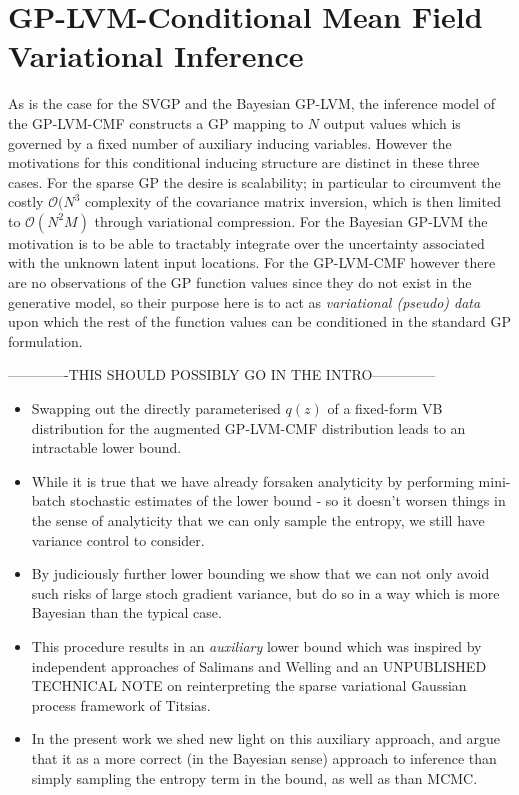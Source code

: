 \documentclass[]{article}
\begin{document}
\section{GP-LVM-Conditional Mean Field Variational Inference} \label{sec:gplvmcmf}

As is the case for the SVGP and the Bayesian GP-LVM, the inference model of the GP-LVM-CMF constructs a GP mapping to $N$ output values which is governed by a fixed number of auxiliary inducing variables.
However the motivations for this conditional inducing structure are distinct in these three cases.
For the sparse GP the desire is scalability; in particular to circumvent the costly $\mathcal{O}(N^3$ complexity of the covariance matrix inversion, which is then limited to $\mathcal{O}(N^2M)$ through variational compression.
For the Bayesian GP-LVM the motivation is to be able to tractably integrate over the uncertainty associated with the unknown latent input locations.
For the GP-LVM-CMF however there are no observations of the GP function values since they do not exist in the generative model, so their purpose here is to act as \emph{variational (pseudo) data} upon which the rest of the function values can be conditioned in the standard GP formulation.

-------------THIS SHOULD POSSIBLY GO IN THE INTRO--------------

\begin{itemize}
  \item Swapping out the directly parameterised $q(z)$ of a fixed-form VB distribution for the augmented GP-LVM-CMF distribution leads to an intractable lower bound.
  \item While it is true that we have already forsaken analyticity by performing mini-batch stochastic estimates of the lower bound - so it doesn't worsen things in the sense of analyticity that we can only sample the entropy, we still have variance control to consider.
  \item By judiciously further lower bounding we show that we can not only avoid such risks of large stoch gradient variance, but do so in a way which is more Bayesian than the typical case.
  \item This procedure results in an \emph{auxiliary} lower bound which was inspired by independent approaches of Salimans and Welling and an UNPUBLISHED TECHNICAL NOTE on reinterpreting the sparse variational Gaussian process framework of Titsias.
  \item In the present work we shed new light on this auxiliary approach, and argue that it as a more correct (in the Bayesian sense) approach to inference than simply sampling the entropy term in the bound, as well as than MCMC.
\end{itemize}
\end{document}
